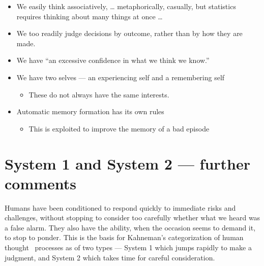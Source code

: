 \documentclass[
  10pt,
  b5paper]{book}
\providecommand{\tightlist}{%
  \setlength{\itemsep}{0pt}\setlength{\parskip}{0pt}}
\begin{document}
\begin{itemize}
\tightlist
\item
  We easily think associatively, \ldots{} metaphorically, casually,
  but statistics requires thinking about many things at once \ldots{}
\item
  We too readily judge decisions by outcome, rather than by how they are made.
\item
  We have ``an excessive confidence in what we think we know.''
\item
  We have two selves --- an experiencing self and a remembering self

  \begin{itemize}
  \tightlist
  \item
    These do not always have the same interests.
  \end{itemize}
\item
  Automatic memory formation has its own rules

  \begin{itemize}
  \tightlist
  \item
    This is exploited to improve the memory of a bad episode
  \end{itemize}
\end{itemize}

\hypertarget{system-1-and-system-2-further-comments}{%
\section{System 1 and System 2 --- further comments}\label{system-1-and-system-2-further-comments}}

Humans have been conditioned to respond quickly to immediate
risks and challenges, without stopping to consider too carefully
whether what we heard was a false alarm. They also have the
ability, when the occasion seems to demand it, to stop to ponder.
This is the basis for Kahneman's categorization of human thought~
processes as of two types --- System 1 which jumps rapidly to
make a judgment, and System 2 which takes time for careful
consideration.
\end{document}
